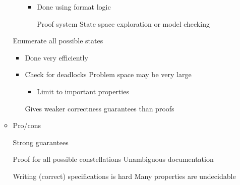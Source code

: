 \begin{itemize}
\begin{itemize}
\begin{itemize}
\begin{itemize}
                        \end{itemize}
                        \begin{itemize}
                             Do the specifications make sense?
                             Requirements are fulfilled under the specifications and requirements
                                \begin{itemize}
                                    \item Often simple but tedious
                                \end{itemize}
                            \item Done using format logic
                                \begin{itemize}
                                     Proof system
                                     State space exploration or model checking
                                \end{itemize}
                        \end{itemize}
                \end{itemize}
             Enumerate all possible states
                \begin{itemize}
                    \item Done very efficiently
                    \item Check for deadlocks
                    \icon Problem space may be very large
                        \begin{itemize}
                            \item Limit to important properties
                        \end{itemize}
                    \icon Gives weaker correctness guarantees than proofs
                \end{itemize}
            \item Pro/cons
                \begin{itemize}
                    \ipro Strong guarantees
                        \begin{itemize}
                            \ipro Proof for all possible constellations
                            \ipro Unambiguous documentation
                        \end{itemize}
                    \icon Writing (correct) specifications is hard
                    \icon Many properties are undecidable

\end{itemize}
\end{itemize}
\end{itemize}
